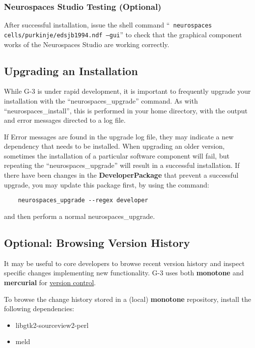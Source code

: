 \documentclass[12pt]{article}
\begin{document}
\subsubsection*{Neurospaces Studio Testing (Optional)}

After successful installation, issue the shell command ``{\tt
  neurospaces cells/purkinje/edsjb1994.ndf --gui}'' to check that the
graphical component works of the Neurospaces Studio are working
correctly.

\subsection*{Upgrading an Installation}

While G-3 is under rapid development, it is important to frequently
upgrade your installation with the ``neurospaces\_upgrade'' command.
As with ``neurospaces\_install'', this is performed in your home
directory, with the output and error messages directed to a log file.

If Error messages are found in the upgrade log file, they may indicate
a new dependency that needs to be installed.  When upgrading an older
version, sometimes the installation of a particular software component
will fail, but repeating the ``neurospaces\_upgrade'' will result in a
successful installation.  If there have been changes in the {\bf
  DeveloperPackage} that prevent a successful upgrade, you may update
this package first, by using the command:

\begin{verbatim}
    neurospaces_upgrade --regex developer
\end{verbatim}

and then perform a normal neurospaces\_upgrade.
 
\subsection*{Optional: Browsing Version History}

It may be useful to core developers to browse recent version history
and inspect specific changes implementing new functionality.  G-3 uses
both {\bf monotone} and {\bf mercurial} for
\href{../version-control/version-control.tex}{version control}.

To browse the change history stored in a (local) {\bf monotone}
repository, install the following dependencies:

\begin{itemize}
\item libgtk2-sourceview2-perl
\item meld
\end{itemize}
\end{document}
